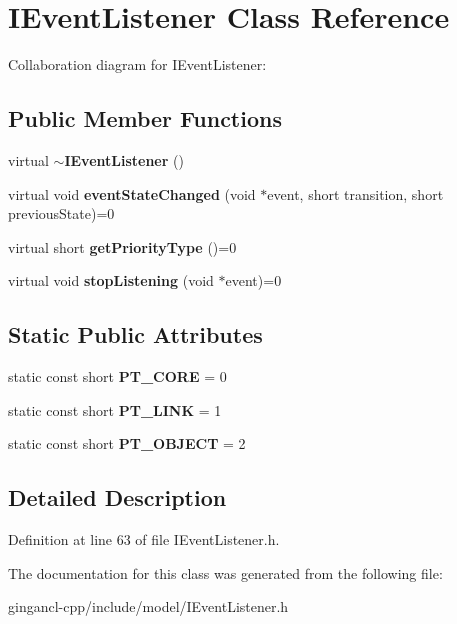\section{IEventListener Class Reference}
\label{classbr_1_1pucrio_1_1telemidia_1_1ginga_1_1ncl_1_1model_1_1event_1_1IEventListener}
Collaboration diagram for IEventListener:\subsection*{Public Member Functions}
\begin{CompactItemize}
\item 
virtual {\bf $\sim$IEventListener} ()\label{classbr_1_1pucrio_1_1telemidia_1_1ginga_1_1ncl_1_1model_1_1event_1_1IEventListener_695d462d67e3f0e55e28c6d07eed067d}

\item 
virtual void \textbf{eventStateChanged} (void $\ast$event, short transition, short previousState)=0\label{classbr_1_1pucrio_1_1telemidia_1_1ginga_1_1ncl_1_1model_1_1event_1_1IEventListener_9b0ac45b64741ce5750429854b112457}

\item 
virtual short \textbf{getPriorityType} ()=0\label{classbr_1_1pucrio_1_1telemidia_1_1ginga_1_1ncl_1_1model_1_1event_1_1IEventListener_3c5adb76525405caf4f660035bcb532b}

\item 
virtual void \textbf{stopListening} (void $\ast$event)=0\label{classbr_1_1pucrio_1_1telemidia_1_1ginga_1_1ncl_1_1model_1_1event_1_1IEventListener_d40a94c6aae1bc474d1fca1464f14401}

\end{CompactItemize}
\subsection*{Static Public Attributes}
\begin{CompactItemize}
\item 
static const short {\bf PT\_\-CORE} = 0\label{classbr_1_1pucrio_1_1telemidia_1_1ginga_1_1ncl_1_1model_1_1event_1_1IEventListener_c2e62e84ac237b7c266af033d89e977d}

\item 
static const short {\bf PT\_\-LINK} = 1\label{classbr_1_1pucrio_1_1telemidia_1_1ginga_1_1ncl_1_1model_1_1event_1_1IEventListener_55640d8aa6ccc7f0c57209cc495912f6}

\item 
static const short {\bf PT\_\-OBJECT} = 2\label{classbr_1_1pucrio_1_1telemidia_1_1ginga_1_1ncl_1_1model_1_1event_1_1IEventListener_695e3883a053e9a2eb3e584e5123ec8e}

\end{CompactItemize}


\subsection{Detailed Description}




Definition at line 63 of file IEventListener.h.

The documentation for this class was generated from the following file:\begin{CompactItemize}
\item 
gingancl-cpp/include/model/IEventListener.h\end{CompactItemize}
